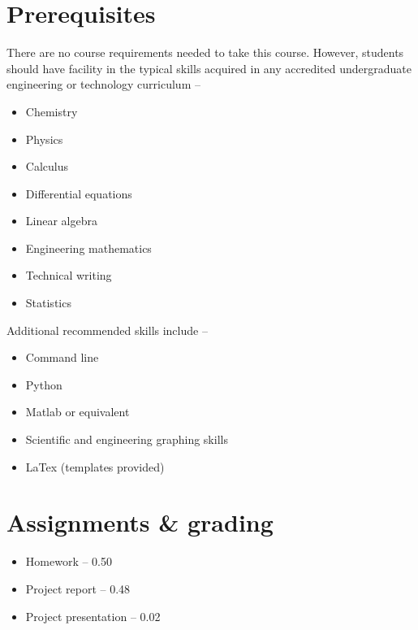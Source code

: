 \documentclass[11pt,letterpaper]{article}
\begin{document}
\section{Prerequisites}
There are no course requirements needed to take this course. However, students should have facility in the typical skills acquired in any accredited undergraduate engineering or technology curriculum --
\begin{itemize}
    \item Chemistry
    \item Physics
    \item Calculus
    \item Differential equations
    \item Linear algebra
    \item Engineering mathematics
    \item Technical writing
    \item Statistics
\end{itemize}

Additional recommended skills include -- 
\begin{itemize}
    \item Command line
    \item Python
    \item Matlab or equivalent
    \item Scientific and engineering graphing skills
    \item LaTex (templates provided)
\end{itemize}


\section{Assignments \& grading}
\begin{itemize}
    \item[]Homework -- 0.50
    \item[]Project report -- 0.48
    \item[]Project presentation -- 0.02
\end{itemize}
\end{document}
